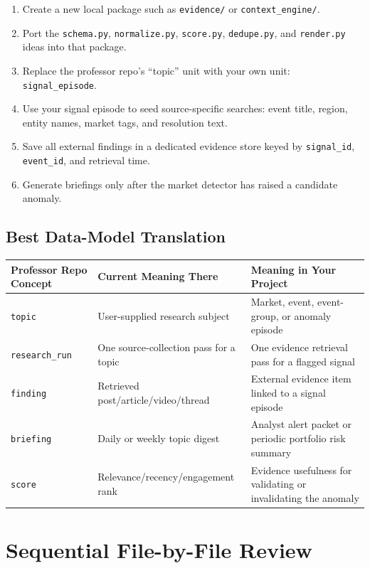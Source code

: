 \documentclass[11pt, letterpaper]{article}
\begin{document}
\begin{enumerate}[nosep]
    \item Create a new local package such as \texttt{evidence/} or \texttt{context\_engine/}.
    \item Port the \texttt{schema.py}, \texttt{normalize.py}, \texttt{score.py}, \texttt{dedupe.py}, and \texttt{render.py} ideas into that package.
    \item Replace the professor repo's ``topic'' unit with your own unit: \texttt{signal\_episode}.
    \item Use your signal episode to seed source-specific searches: event title, region, entity names, market tags, and resolution text.
    \item Save all external findings in a dedicated evidence store keyed by \texttt{signal\_id}, \texttt{event\_id}, and retrieval time.
    \item Generate briefings only after the market detector has raised a candidate anomaly.
\end{enumerate}

\subsection{Best Data-Model Translation}

\begin{longtable}{p{4.3cm}p{4.2cm}p{4.8cm}}
\toprule
\textbf{Professor Repo Concept} & \textbf{Current Meaning There} & \textbf{Meaning in Your Project} \\
\midrule
\endhead
\texttt{topic} & User-supplied research subject & Market, event, event-group, or anomaly episode \\
\texttt{research\_run} & One source-collection pass for a topic & One evidence retrieval pass for a flagged signal \\
\texttt{finding} & Retrieved post/article/video/thread & External evidence item linked to a signal episode \\
\texttt{briefing} & Daily or weekly topic digest & Analyst alert packet or periodic portfolio risk summary \\
\texttt{score} & Relevance/recency/engagement rank & Evidence usefulness for validating or invalidating the anomaly \\
\bottomrule
\end{longtable}

\section{Sequential File-by-File Review}
\end{document}
